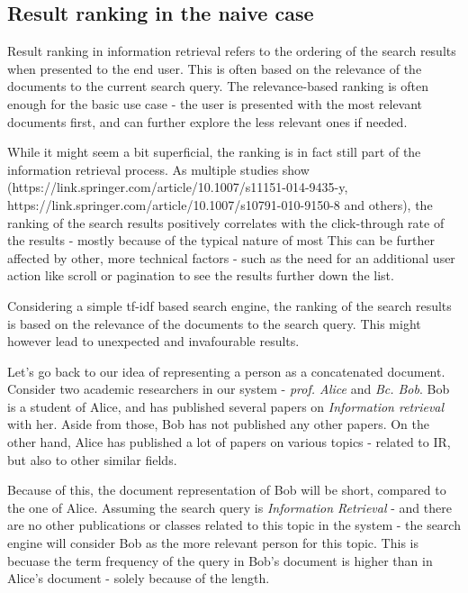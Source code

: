\subsection{Result ranking in the naive case}

Result ranking in information retrieval refers to the ordering of the search results when presented to the end user. This is often based on the relevance of the documents to the current search query.
The relevance-based ranking is often enough for the basic use case - the user is presented with the most relevant documents first, and can further explore the less relevant ones if needed.

While it might seem a bit superficial, the ranking is in fact still part of the information retrieval process. 
As multiple studies show (https://link.springer.com/article/10.1007/s11151-014-9435-y, https://link.springer.com/article/10.1007/s10791-010-9150-8 and others), 
the ranking of the search results positively correlates with the click-through rate of the results - mostly because of the typical nature of most %
This can be further affected by other, more technical factors - such as the need for an additional user action like scroll or pagination to see the results further down the list.


Considering a simple tf-idf based search engine, the ranking of the search results is based on the relevance of the documents to the search query.
This might however lead to unexpected and invafourable results.

Let's go back to our idea of representing a person as a concatenated document.
Consider two academic researchers in our system - \textit{prof. Alice} and \textit{Bc. Bob}. 
Bob is a student of Alice, and has published several papers on \textit{Information retrieval} with her. Aside from those, Bob has not published any other papers.
On the other hand, Alice has published a lot of papers on various topics - related to IR, but also to other similar fields. 

Because of this, the document representation of Bob will be short, compared to the one of Alice.
Assuming the search query is \textit{Information Retrieval} - and there are no other publications or classes related to this topic in the system - 
the search engine will consider Bob as the more relevant person for this topic. This is becuase the term frequency of the query in Bob's document is higher than in Alice's document - solely because of the length.

